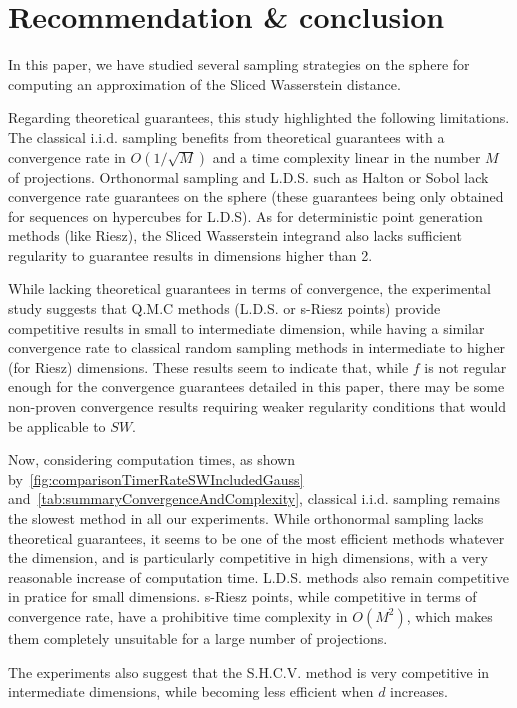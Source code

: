 \section{Recommendation \& conclusion}\label{sec:Recommendation}

In this paper, we have studied several sampling strategies on the sphere 
for computing an {approximation} of the Sliced Wasserstein distance.

Regarding theoretical guarantees, this study highlighted the following limitations. {The classical i.i.d. sampling benefits from theoretical guarantees with a convergence rate in $O(1/\sqrt{M})$ and a time complexity linear in the number $M$ of projections. Orthonormal sampling and  L.D.S. such as Halton or Sobol lack convergence rate guarantees on the sphere (these guarantees being only obtained for sequences on hypercubes for L.D.S).} As for deterministic point generation methods (like Riesz), the Sliced Wasserstein integrand also lacks sufficient regularity to guarantee results in dimensions higher than 2.


{While lacking theoretical guarantees in terms of convergence, the experimental study  suggests that Q.M.C methods (L.D.S. or s-Riesz points) provide competitive results in small to intermediate dimension, while having a similar convergence rate to classical random sampling methods in intermediate to higher (for Riesz) dimensions. These results seem to indicate that, while $f$ 
is not regular enough for the convergence guarantees detailed in this paper, there may be some non-proven convergence results 
requiring weaker regularity conditions that would be applicable to $SW$.} 

{Now, considering computation times, as shown by~\autoref{fig:comparisonTimerRateSWIncludedGauss} and~\autoref{tab:summaryConvergenceAndComplexity},  classical i.i.d. sampling remains the slowest method in all our experiments. While orthonormal sampling lacks theoretical guarantees, it seems to be one of the most  efficient methods whatever the dimension, and is particularly competitive in high dimensions, with a very reasonable increase of computation time. L.D.S. methods also remain competitive in pratice for small dimensions.
s-Riesz points, while competitive in terms of convergence rate, have a prohibitive time complexity in $O(M^2)$, which makes them completely unsuitable for a large number of projections.} 

{The experiments also suggest that the S.H.C.V. method is very competitive in intermediate dimensions, while becoming less efficient when $d$ increases. }

